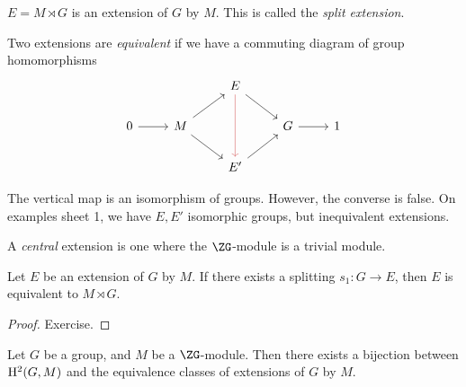 \documentclass{article}
\begin{document}
\begin{example}
    \(E = M \rtimes G\) is an extension of \(G\) by \(M\). This is called the \emph{split extension}.
\end{example}

\begin{definition}
    [equivalent]
    Two extensions are \emph{equivalent} if we have a commuting diagram of group homomorphisms
    \[\begin{tikzcd}
        && E \\
        0 & M && G & 1 \\
        && {E'}
        \arrow[from=2-1, to=2-2]
        \arrow[from=2-2, to=1-3]
        \arrow[from=1-3, to=2-4]
        \arrow[from=2-4, to=2-5]
        \arrow[from=2-2, to=3-3]
        \arrow[from=3-3, to=2-4]
        \arrow[color={rgb,255:red,214;green,92;blue,92}, from=1-3, to=3-3]
    \end{tikzcd}\] 
\end{definition}

\begin{remark}
    The vertical map is an isomorphism of groups. However, the converse is false. On examples sheet 1, we have \(E, E'\) isomorphic groups, but inequivalent extensions.
\end{remark}

\begin{definition}
     A \emph{central} extension is one where the \(\ZG\)-module is a trivial module.
\end{definition}

\begin{proposition}
    Let \(E\) be an extension of \(G\) by \(M\). If there exists a splitting \(s_1 : G \to E\), then \(E\) is equivalent to \(M \rtimes G\).
\end{proposition}

\begin{proof}
    Exercise.
\end{proof}

\begin{theorem}
    Let \(G\) be a group, and \(M\) be a \(\ZG\)-module. Then there exists a bijection between \(\mathrm{H}^2(G, M)\) and the equivalence classes of extensions of \(G\) by \(M\).
\end{theorem}
\end{document}
